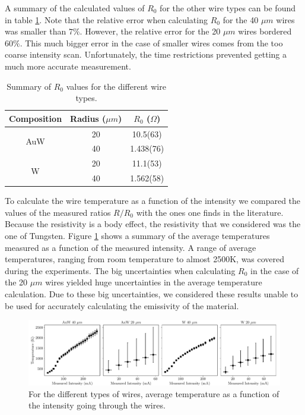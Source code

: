 A summary of the calculated values of $R_0$ for the other wire types can be found in table \ref{tab:R0table}. Note that the relative error when calculating $R_0$ for the 40 $\mu m$ wires was smaller than $7\%$. However, the relative error for the 20 $\mu m$ wires bordered $60 \%$. This much bigger error in the case of smaller wires comes from the too coarse intensity scan. Unfortunately, the time restrictions prevented getting a much more accurate measurement. 

\begin{table}[h]
    \centering
    \begin{tabular}{ccc}
    \hline
    Composition          & Radius ($\mu m$) & $R_0$ ($\Omega$) \\ \hline
    \multirow{2}{*}{AuW} & 20               & 10.5(63)         \\
                         & 40               & 1.438(76)        \\
    \multirow{2}{*}{W}   & 20               & 11.1(53)         \\
                         & 40               & 1.562(58)        \\ \hline
    \end{tabular}
    \caption{Summary of $R_0$ values for the different wire types. }
    \label{tab:R0table}
\end{table}

To calculate the wire temperature as a function of the intensity we compared the values of the measured ratios $R/R_{0}$ with the ones one finds in the literature. Because the resistivity is a body effect, the resistivity that we considered was the one of Tungsten. Figure \ref{fig:MeasTempCurrent} shows a summary of the average temperatures measured as a function of the measured intensity. A range of average temperatures, ranging from room temperature to almost 2500K, was covered during the experiments. The big uncertainties when calculating $R_0$ in the case of the 20 $\mu m$ wires yielded huge uncertainties in the average temperature calculation. Due to these big uncertainties, we considered these results unable to be used for accurately calculating the emissivity of the material.  

\begin{figure}[h]
    \centering
    \includegraphics[width=1.0\columnwidth]{Figure_CalculatedIntTemp/IntensityTemp.pdf}
    \caption{For the different types of wires, average temperature as a function of the intensity going through the wires.}
    \label{fig:MeasTempCurrent}
\end{figure}

